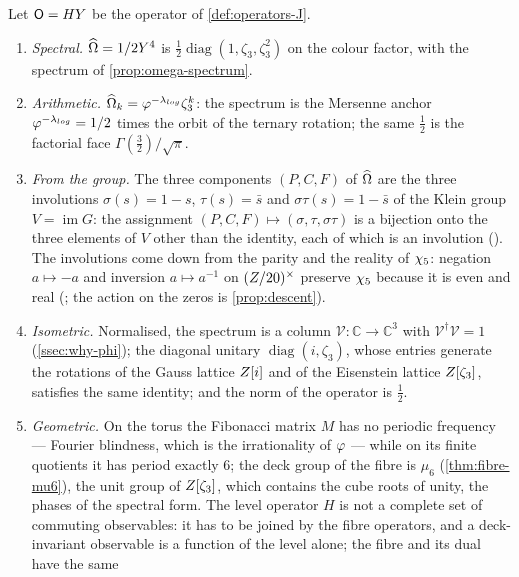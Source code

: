 \begin{theorem}\label{thm:operator-forms}
Let $\mathsf{O}=HY$ be the operator of \cref{def:operators-J}.
\begin{enumerate}[label=\textup{(\roman*)}]
  \item \emph{Spectral.}  $\widehat{\Omega}=1/2Y^4$ is $\tfrac12\operatorname{diag}(1,\zeta_3,\zeta_3^2)$ on the colour factor, with the
    spectrum of \cref{prop:omega-spectrum}.
  \item \emph{Arithmetic.}  $\widehat{\Omega}_k=\varphi^{-\lambda_{log}}\zeta_3^k$: the spectrum is the
    Mersenne anchor $\varphi^{-\lambda_{log}}=1/2$ times the orbit of the ternary rotation;
    the same $\tfrac12$ is the factorial face $\Gamma(\tfrac32)/\sqrt\pi$.
  \item \emph{From the group.}  The three components $(P,C,F)$ of $\widehat{\Omega}$ are the three
    involutions $\sigma(s)=1-s$, $\tau(s)=\bar s$ and $\sigma\tau(s)=1-\bar s$ of the Klein group $V=\operatorname{im}G$:
    the assignment $(P,C,F)\mapsto(\sigma,\tau,\sigma\tau)$ is a bijection onto the three elements of $V$ other than the identity,
    each of which is an involution ().  The involutions
    come down from the parity and the reality of $\chi_5$: negation $a\mapsto-a$ and inversion $a\mapsto a^{-1}$ on $(Z/20)^{\times}$
    preserve $\chi_5$ because it is even and real (; the action on the zeros is \cref{prop:descent}).
  \item \emph{Isometric.}  Normalised, the spectrum is a column $\mathcal V\colon\mathbb{C}\to\mathbb{C}^3$ with $\mathcal V^\dagger\mathcal V=1$ (\cref{ssec:why-phi}); the diagonal unitary $\operatorname{diag}(i,\zeta_3)$, whose entries generate the rotations of the Gauss lattice $Z[i]$ and of the Eisenstein lattice $Z[\zeta_3]$, satisfies the same identity; and the norm of the operator is $\tfrac12$.
  \item \emph{Geometric.}  On the torus the Fibonacci matrix $M$ has no periodic
    frequency --- Fourier blindness, which is the irrationality of $\varphi$ --- while
    on its finite quotients it has period exactly $6$; the deck group of the fibre is
    $\mu_6$ (\cref{thm:fibre-mu6}), the unit group of $Z[\zeta_3]$, which contains the cube roots of unity, the phases of the spectral form.  The level operator $H$ is not a complete set of commuting
    observables: it has to be joined by the fibre operators, and a deck-invariant
    observable is a function of the level alone; the fibre and its dual have the same

\end{enumerate}
\end{theorem}
